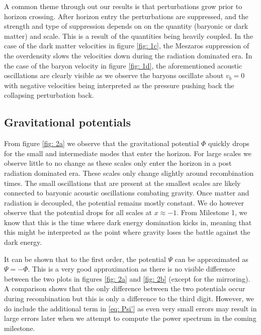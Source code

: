 \documentclass[a4paper, 10pt, reqno]{amsart}
\begin{document}
A common theme through out our results is that perturbations grow prior to horizon crossing. After horizon entry the perturbations are suppressed, and the strength and type of suppression depends on on the quantity (baryonic or dark matter) and scale. This is a result of the quantities being heavily coupled. In the case of the dark matter velocities in figure \ref{fig: 1c}, the Meszaros suppression of the overdensity slows the velocities down during the radiation dominated era. In the case of the baryon velocity in figure \ref{fig: 1d}, the aforementioned acoustic oscillations are clearly visible as we observe the baryons oscillate about $v_b = 0$ with negative velocities being interpreted as the pressure pushing back the collapsing perturbation back.

\subsection{Gravitational potentials}
From figure \ref{fig: 2a} we observe that the gravitational potential $\Phi$ quickly drops for the small and intermediate modes that enter the horizon. For large scales we observe little to no change as these scales only enter the horizon in a post radiation dominated era. These scales only change slightly around recombination times. The small oscillations that are present at the smallest scales are likely connected to baryonic acoustic oscillations combating gravity. Once matter and radiation is decoupled, the potential remains mostly constant. We do however observe that the potential drops for all scales at $x \approx -1$. From Milestone 1, we know that this is the time where dark energy domination kicks in, meaning that this might be interpreted as the point where gravity loses the battle against the dark energy.

It can be shown that to the first order, the potential $\Psi$ can be approximated as $\Psi = -\Phi$. This is a very good approximation as there is no visible difference between the two plots in figures \ref{fig: 2a} and \ref{fig: 2b} (except for the mirroring). A comparison shows that the only difference between the two potentials occur during recombination but this is only a difference to the third digit. However, we do include the additional term in \eqref{eq: Psi'} as even very small errors may result in large errors later when we attempt to compute the power spectrum in the coming milestone.
\end{document}
